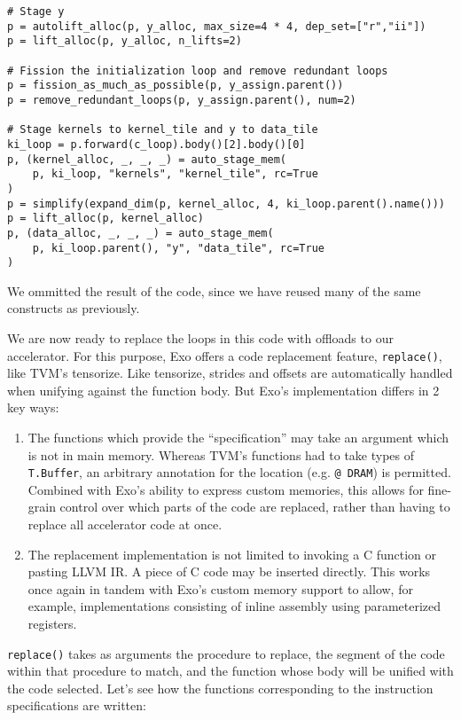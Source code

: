 \documentclass[acmsmall, nonacm=true]{acmart}
\begin{document}
\begin{verbatim}
# Stage y
p = autolift_alloc(p, y_alloc, max_size=4 * 4, dep_set=["r","ii"])
p = lift_alloc(p, y_alloc, n_lifts=2)

# Fission the initialization loop and remove redundant loops
p = fission_as_much_as_possible(p, y_assign.parent())
p = remove_redundant_loops(p, y_assign.parent(), num=2)

# Stage kernels to kernel_tile and y to data_tile
ki_loop = p.forward(c_loop).body()[2].body()[0]
p, (kernel_alloc, _, _, _) = auto_stage_mem(
    p, ki_loop, "kernels", "kernel_tile", rc=True
)
p = simplify(expand_dim(p, kernel_alloc, 4, ki_loop.parent().name()))
p = lift_alloc(p, kernel_alloc)
p, (data_alloc, _, _, _) = auto_stage_mem(
    p, ki_loop.parent(), "y", "data_tile", rc=True
)
\end{verbatim}

We ommitted the result of the code, since we have reused many of the same constructs as previously.

We are now ready to replace the loops in this code with offloads to our accelerator. For this purpose, Exo offers a code replacement feature, \verb|replace()|, like TVM's tensorize. Like tensorize, strides and offsets are automatically handled when unifying against the function body. But Exo's implementation differs in 2 key ways:
\begin{enumerate}
    \item The functions which provide the ``specification'' may take an argument which is not in main memory. Whereas TVM's functions had to take types of \verb|T.Buffer|, an arbitrary annotation for the location (e.g. \verb|@ DRAM|) is permitted. Combined with Exo's ability to express custom memories, this allows for fine-grain control over which parts of the code are replaced, rather than having to replace all accelerator code at once. 
    \item The replacement implementation is not limited to invoking a C function or pasting LLVM IR. A piece of C code may be inserted directly. This works once again in tandem with Exo's custom memory support to allow, for example, implementations consisting of inline assembly using parameterized registers. 
\end{enumerate}

\verb|replace()| takes as arguments the procedure to replace, the segment of the code within that procedure to match, and the function whose body will be unified with the code selected. Let's see how the functions corresponding to the instruction specifications are written:
\end{document}
